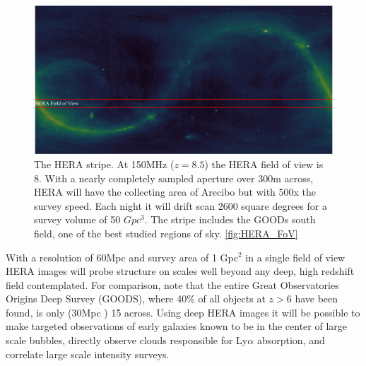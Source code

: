 \documentclass[preprint]{aastex}
\begin{document}
\begin{figure}[t]\centering
\includegraphics[width=\textwidth]{plots/Imaging/HERA_FoV.jpg}
\caption{The HERA stripe.  At 150MHz ($z=8.5$) the HERA field of view is 8\arcdeg.  With a nearly completely sampled aperture over 300m across, HERA will have the collecting area of Arecibo but with 500x the survey speed. Each night it will drift scan 2600 square degrees for a survey volume of 50 $Gpc^3$.  The stripe includes the GOODs south field, one of the best studied regions of sky. \ref{fig:HERA_FoV}}
\end{figure}

With a resolution of 60Mpc and survey area of 1 Gpc$^2$ in a single field of view HERA images will probe structure on scales well beyond any deep, high redshift field contemplated. For comparison, note that the entire Great Observatories Origins Deep Survey (GOODS), where 40\% of all objects at $z > 6$ have been found, is only (30Mpc ) 15{\arcmin } across. Using deep HERA images it will be possible to make targeted observations of early galaxies known to be in the center of large scale bubbles, directly observe clouds responsible for Ly$\alpha$ absorption, and correlate large scale intensity surveys.
\end{document}
